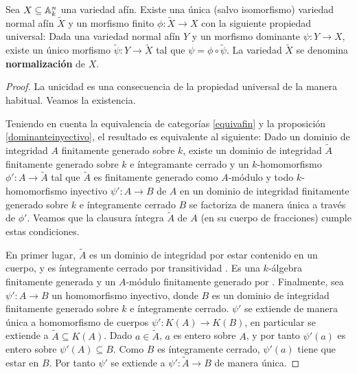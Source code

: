\documentclass[ACGA.tex]{subfiles}
\begin{document}
\begin{prop}
 Sea $X\subseteq\mathbb{A}^n_k$ una variedad afín. Existe una única (salvo isomorfismo) variedad normal afín $\tilde X$ y un morfismo finito $\phi:\tilde X\to X$ con la siguiente propiedad universal: Dada una variedad normal afín $Y$ y un morfismo dominante $\psi:Y\to X$, existe un único morfismo $\tilde\psi:Y\to\tilde X$ tal que $\psi=\phi\circ\tilde\psi$. La variedad $\tilde X$ se denomina {\bf normalización} de $X$.
\end{prop}

\begin{proof} La unicidad es una consecuencia de la propiedad universal de la manera habitual. Veamos la existencia.

 Teniendo en cuenta la equivalencia de categorías \ref{equivafin} y la proposición \ref{dominanteinyectivo}, el resultado es equivalente al siguiente: Dado un dominio de integridad $A$ finitamente generado sobre $k$, existe un dominio de integridad $\tilde A$ finitamente generado sobre $k$ e íntegramante cerrado y un $k$-homomorfismo $\phi':A\to \tilde A$ tal que $\tilde A$ es finitamente generado como $A$-módulo y todo $k$-homomorfismo inyectivo $\psi':A\to B$ de $A$ en un dominio de integridad finitamente generado sobre $k$ e íntegramente cerrado $B$ se factoriza de manera única a través de $\phi'$. Veamos que la clausura íntegra $\tilde A$ de $A$ (en su cuerpo de fracciones) cumple estas condiciones.

En primer lugar, $\tilde A$ es un dominio de integridad por estar contenido en un cuerpo, y es íntegramente cerrado por transitividad \cite[Corolario 5.4]{am}. Es una $k$-álgebra finitamente generada y un $A$-módulo finitamente generado por \cite[Theorem 3.9A]{h}. Finalmente, sea $\psi':A\to B$ un homomorfismo inyectivo, donde $B$ es un dominio de integridad finitamente generado sobre $k$ e íntegramente cerrado. $\psi'$ se extiende de manera única a homomorfismo de cuerpos $\psi':K(A)\to K(B)$, en particular se extiende a $\tilde A\subseteq K(A)$. Dado $a\in\tilde A$, $a$ es entero sobre $A$, y por tanto $\psi'(a)$ es entero sobre $\psi'(A)\subseteq B$. Como $B$ es íntegramente cerrado, $\psi'(a)$ tiene que estar en $B$. Por tanto $\psi'$ se extiende a $\psi':\tilde A\to B$ de manera única.  
\end{proof}
\end{document}
